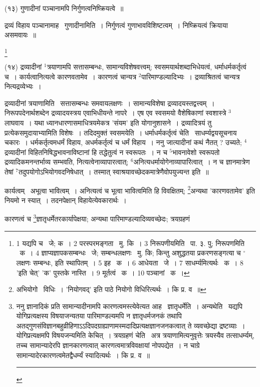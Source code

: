 \documentclass[11pt, openany]{book}
\newcommand\blfootnote[1]{%
 \begingroup
 \renewcommand\thefootnote{}\footnote{#1}%
 \addtocounter{footnote}{-1}%
 \endgroup
}
\begin{document}
{\knu (१३) गुणादीनां पञ्चानामपि निर्गुणत्वनिष्क्रियत्वे~॥}

द्रव्यं विहाय पञ्चानामाह \textendash\ गुणादीनामिति~। निर्गुणत्वं गुणाभावविशिष्टत्वम्~। निष्क्रियत्वं क्रियाया असमवायः~॥

\blfootnote{1 यद्यपि च  \textendash\ जे; क~। 2 परस्परमङ्गता  \textendash\ मु. कि~। 3 निरूपणीयमिति  \textendash\ पा. ३. पु; निरूपणमिति  \textendash\ क~। 4 ज्ञाप्यज्ञापकसम्बन्धः  \textendash\ जे; सम्बन्धलक्षणः  \textendash\ मु. कि; किन्तु अशुद्धतया प्रकरणसङ्गत्या च ${}^\circ$लक्षणः सम्बन्धः, इति स्थापितम्~। 5 इह  \textendash\ क~। 6 आधेयता  \textendash\ जे~। 7 साधर्म्यमित्यर्थः  \textendash\ क~। 8 'इति चेत्' 'क' पुस्तके नास्ति~। 9 मूर्तत्वं  \textendash\ क~। 10 पञ्चानां  \textendash\ क~।}

\newpage
\hangindent=2cm {\knu (१४) द्रव्यादीनां ${}^1$त्रयाणामपि सत्तासम्बन्धः, सामान्यविशेषवत्त्वम्; स्वसमयार्थशब्दाभिधेयत्वं, धर्माधर्मकर्तृत्वं च~। कार्यत्वानित्यत्वे कारणवतामेव~। कारणत्वं चान्यत्र ${}^2$पारिमाण्डल्यादिभ्यः~। द्रव्याश्रितत्वं चान्यत्र नित्यद्रव्येभ्यः~।}

{\knu द्रव्यादीनां त्रयाणा}मिति \textendash\ सत्तासम्बन्धः समवायलक्षणः~। सामान्यविशेषा द्रव्यादयस्तद्वत्त्वम्~। निरूपपदेनार्थशब्देन द्रव्यादयस्त्रय एवाभिधीयन्ते नापरे~। एष एव स्वसमयो {\knu वैशेषिका}णां स्वशास्त्रे ${}^3$लाघवाय~। यथा ध्यानधारणासमाधित्रयमेकत्र 'संयम' इति योगानुशासने~। द्रव्यादित्रयं तु प्रत्येकसमुदायाभ्यामिति विशेषः~। तदिदमुक्तं {\knu स्वसम}येति~। {\knu धर्माधर्मकर्तृत्वं चे}ति \textendash\ साधर्म्यद्वयसूचनाय चकारः~। धर्मकर्तृत्वमधर्मं विहाय, अधर्मकर्तृत्वं च धर्मं विहाय~। ननु जात्यादीनां कथं नैतत् ? उच्यते; ${}^4$द्रव्यादीनां विहितनिषिद्धभावनाविष्टानां हि तद्धेतुत्वं न स्वरूपतः~। न च ${}^5$भावनावेशो स्वरूपतो द्रव्यादिकमनन्तर्भाव्य सम्भवति, नित्यत्वेनाव्यापारत्वात्; ${}^6$अनित्यधर्मायोगेनाव्यापारित्वात्~। न च ज्ञानमात्रेण तेषां ${}^7$तदुपयोगोऽभियोगवदनिषेधात्~। तस्मात् स्वाश्रयावच्छेदकमात्रेणैवोपयुज्यन्त इति~॥

कार्यत्वम् \textendash\ अभूत्वा भावित्वम्~। अनित्यत्वं च भूत्वा भावित्वमिति हि विवक्षितम्; \renewcommand{\thefootnote}{१}\footnote{अभियोगो  \textendash\ विधिः~। 'नियोगवद्' इति पाठे नियोगो विधिरित्यर्थः~। कि प्र. व~॥}अन्यथा 'कारणवतामेव' इति नियमो न स्यात्~। तदनपेक्षान् विहायेत्येवकारार्थः~।

कारणत्वं च \renewcommand{\thefootnote}{२}\footnote{ननु ज्ञानादिकं प्रति सामान्यादीनामपि कारणत्वमस्त्येवेत्यत आह \textendash\ ज्ञातृधर्मेति~। अन्यथेति \textendash\ यद्यपि योगिप्रत्यक्षस्य विषयाजन्यतया पारिमाण्डल्यमपि न ज्ञातृधर्मजनकं तथापि अतद्गुणसंविज्ञानबहुव्रीहिणाऽऽदिपदग्राह्याणामस्मदादिप्रत्यक्षज्ञानजनकत्वात् ते व्यवच्छेद्या द्रष्टव्याः~। योगिप्रत्यक्षमपि विषयजन्यमिति केचित्~। त्रयग्रहणं चेति \textendash\ अत्र त्रयाणामित्यनुवृत्तेः त्रयस्यैव तत्साधर्म्यम्, तच्च सामान्यादेरपि ज्ञानकारणत्वात् कारणत्वमात्रविवक्षायां नोपपद्येत~। न चाग्रे सामान्यादेरकारणत्वमेतद्वैधर्म्यं स्यादित्यर्थः~। कि प्र. व~॥ \rule{0.4\linewidth}{0.5pt}}ज्ञातृधर्मेतरकार्यापेक्षया; अन्यथा पारिमाण्डल्यादिव्यवच्छेदः; त्रयग्रहणं
\end{document}
